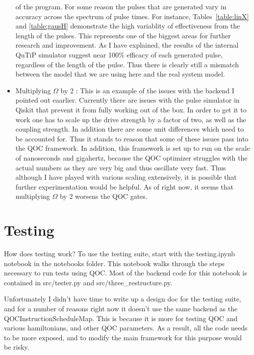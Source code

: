 \documentclass[12pt]{article}
\begin{document}
\begin{itemize}
    of the program. For some reason the pulses that are generated vary in
    accuracy across the spectrum of pulse times. For instance,
    Tables~\ref{table:linX} and \ref{table:gausH} demonstrate the high
    variablity of effectiveness from the length of the pulses.  This represents one of the biggest areas for further research and improvement. As I have explained, the results of the internal QuTiP simulator suggest near 100\% efficacy of each generated pulse, regardless of the length of the pulse. Thus there is clearly still a mismatch between the model that we are using here and the real system model.
    \item Multiplying $\Omega$ by 2 : This is an example of the issues with the
    backend I pointed out eaarlier. Currently there are issues with the pulse
    simulator in Qiskit that prevent it from fully working out of the box. In
    order to get it to work one has to scale up the drive strength by a factor
    of two, as well as the coupling strength. In addition there are some unit
    differences which need to be accounted for. Thus it stands to reason that
    some of these issues pass into the QOC framework. In addition, this
    framework is set up to run on the scale of nanoseconds and gigahertz,
    because the QOC optimizer struggles with the actual numbers as they are very
    big and thus oscillate very fast. Thus although I have played with various
    scaling extensively, it is possible that further experimentation would be
    helpful. As of right now, it seems that multiplying $\Omega$ by 2 worsens
    the QOC gates.
\end{itemize}

\section{Testing}\label{testing} How does testing work? To use the testing suite, start with the testing.ipynb notebook in the
notebooks folder. This notebook walks through the steps necessary to run tests
using QOC. Most of the backend code for this notebook is contained in
src/tester.py and src/three\_restructure.py.

Unfortunately I didn't
have time to write up a design doc for the testing suite, and for a number of
reasons right now it doesn't use the same backend as the
QOCInstructionScheduleMap. This is because it is more for testing QOC and
various hamiltonians, and other QOC parameters. As a result, all the code needs
to be more exposed, and to modify the main framework for this purpose would be
risky. 
\end{document}
